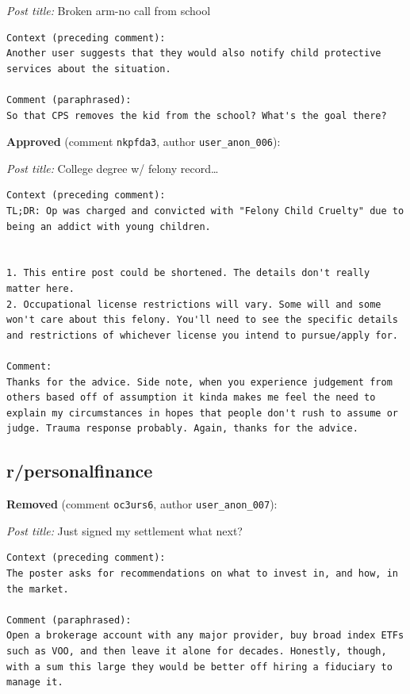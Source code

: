 \noindent\emph{Post title:} Broken arm-no call from school

\begin{lstlisting}
Context (preceding comment):
Another user suggests that they would also notify child protective services about the situation.

Comment (paraphrased):
So that CPS removes the kid from the school? What's the goal there?
\end{lstlisting}

\noindent\textbf{Approved} (comment \texttt{nkpfda3}, author \texttt{user\_anon\_006}):

\noindent\emph{Post title:} College degree w/ felony record…

\begin{lstlisting}
Context (preceding comment):
TL;DR: Op was charged and convicted with "Felony Child Cruelty" due to being an addict with young children.


1. This entire post could be shortened. The details don't really matter here.
2. Occupational license restrictions will vary. Some will and some won't care about this felony. You'll need to see the specific details and restrictions of whichever license you intend to pursue/apply for.

Comment:
Thanks for the advice. Side note, when you experience judgement from others based off of assumption it kinda makes me feel the need to explain my circumstances in hopes that people don't rush to assume or judge. Trauma response probably. Again, thanks for the advice.
\end{lstlisting}


\subsection*{r/personalfinance}

\noindent\textbf{Removed} (comment \texttt{oc3urs6}, author \texttt{user\_anon\_007}):

\noindent\emph{Post title:} Just signed my settlement what next?

\begin{lstlisting}
Context (preceding comment):
The poster asks for recommendations on what to invest in, and how, in the market.

Comment (paraphrased):
Open a brokerage account with any major provider, buy broad index ETFs such as VOO, and then leave it alone for decades. Honestly, though, with a sum this large they would be better off hiring a fiduciary to manage it.
\end{lstlisting}

